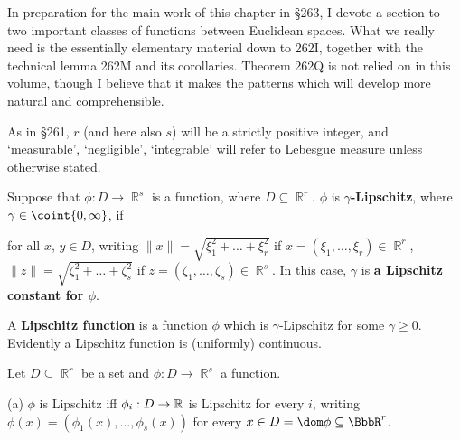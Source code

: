 
\def\dist{\mathop{\text{dist}}}

\def\chaptername{Change of variable in the integral}
\def\sectionname{Lipschitz and differentiable functions}


In preparation for the main work of this chapter in \S263, I devote a
section to two important classes of functions between Euclidean spaces.
What we really need is the essentially elementary material down to 262I,
together with the technical lemma 262M and its corollaries.   Theorem
262Q is not relied on in this volume, though I believe that it makes the
patterns which will develop more natural and comprehensible.

As in \S261, $r$ (and here also $s$) will be a strictly positive integer,
and `measurable', `negligible', `integrable' will refer to Lebesgue measure
unless otherwise stated.

 Suppose that
$\phi:D\to\BbbR^s$ is a function, where $D\subseteq\BbbR^r$.   
$\phi$ is {\bf $\gamma$-Lipschitz}, where
$\gamma\in\coint{0,\infty}$, if


\noindent for all $x$, $y\in D$, writing
$\|x\|=\sqrt{\xi_1^2+\ldots+\xi_r^2}$ if
$x=(\xi_1,\ldots,\xi_r)\in\BbbR^r$,
$\|z\|=\sqrt{\zeta_1^2+\ldots+\zeta_s^2}$ if
$z=(\zeta_1,\ldots,\zeta_s)\in\BbbR^s$.   In this case, $\gamma$ is
{\bf a Lipschitz constant for $\phi$}.

A {\bf Lipschitz function} is a function $\phi$ which is
$\gamma$-Lipschitz for some $\gamma\ge 0$.
Evidently a Lipschitz function is (uniformly) continuous.

 Let $D\subseteq\BbbR^r$ be a set and
$\phi:D\to\BbbR^s$ a function.

(a)  $\phi$ is Lipschitz iff $\phi_i:D\to\Bbb R$
is Lipschitz for every $i$, writing
$\phi(x)=(\phi_1(x),\ldots,\phi_s(x))$ for every $x\in
D=\dom\phi\subseteq\BbbR^r$.

